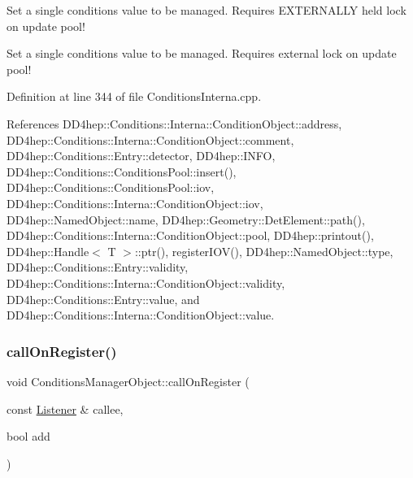 Set a single conditions value to be managed. Requires E\+X\+T\+E\+R\+N\+A\+L\+LY held lock on update pool!

Set a single conditions value to be managed. Requires external lock on update pool! 

Definition at line 344 of file Conditions\+Interna.\+cpp.



References D\+D4hep\+::\+Conditions\+::\+Interna\+::\+Condition\+Object\+::address, D\+D4hep\+::\+Conditions\+::\+Interna\+::\+Condition\+Object\+::comment, D\+D4hep\+::\+Conditions\+::\+Entry\+::detector, D\+D4hep\+::\+I\+N\+FO, D\+D4hep\+::\+Conditions\+::\+Conditions\+Pool\+::insert(), D\+D4hep\+::\+Conditions\+::\+Conditions\+Pool\+::iov, D\+D4hep\+::\+Conditions\+::\+Interna\+::\+Condition\+Object\+::iov, D\+D4hep\+::\+Named\+Object\+::name, D\+D4hep\+::\+Geometry\+::\+Det\+Element\+::path(), D\+D4hep\+::\+Conditions\+::\+Interna\+::\+Condition\+Object\+::pool, D\+D4hep\+::printout(), D\+D4hep\+::\+Handle$<$ T $>$\+::ptr(), register\+I\+O\+V(), D\+D4hep\+::\+Named\+Object\+::type, D\+D4hep\+::\+Conditions\+::\+Entry\+::validity, D\+D4hep\+::\+Conditions\+::\+Interna\+::\+Condition\+Object\+::validity, D\+D4hep\+::\+Conditions\+::\+Entry\+::value, and D\+D4hep\+::\+Conditions\+::\+Interna\+::\+Condition\+Object\+::value.

\hypertarget{class_d_d4hep_1_1_conditions_1_1_conditions_manager_object_a74aa106c194fb9ca929c8cf523632ce3}{}\label{class_d_d4hep_1_1_conditions_1_1_conditions_manager_object_a74aa106c194fb9ca929c8cf523632ce3} 
\subsubsection{\texorpdfstring{call\+On\+Register()}{callOnRegister()}}
{\footnotesize\ttfamily void Conditions\+Manager\+Object\+::call\+On\+Register (\begin{DoxyParamCaption}\item[{const \hyperlink{class_d_d4hep_1_1_conditions_1_1_conditions_manager_object_ac4cd1e3a448bc1f8bae384d194f10c23}{Listener} \&}]{callee,  }\item[{bool}]{add }\end{DoxyParamCaption})}



